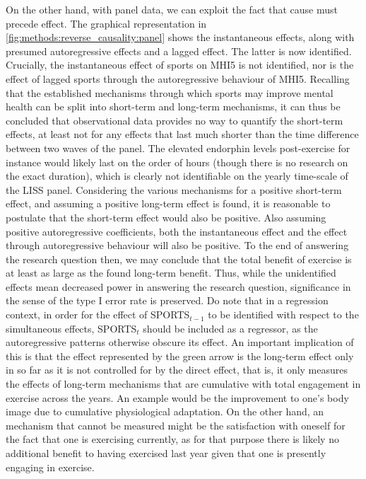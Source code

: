 On the other hand, with panel data, we can exploit the fact that cause must precede effect. The graphical representation
in \cref{fig:methods:reverse_causality:panel} shows the instantaneous effects, along with presumed
autoregressive effects and a lagged effect.
The latter is now identified. Crucially, the instantaneous effect of sports on MHI5 is not identified, nor is the effect
of lagged sports through the autoregressive behaviour of MHI5.
Recalling that the established mechanisms through which sports may improve mental health can be split into short-term
and long-term mechanisms, it can thus be concluded that observational data provides no way to quantify the short-term effects,
at least not for any effects that last much shorter than the time difference between two waves of the panel.
The elevated endorphin levels post-exercise for instance would likely last on the order of hours (though there is no
research on the exact duration), which is clearly not identifiable on the yearly time-scale of the LISS panel.
Considering the various mechanisms for a positive short-term effect, and assuming a positive long-term effect is found,
it is reasonable to postulate that the short-term effect would also be positive.
Also assuming positive autoregressive coefficients, both the instantaneous effect and the effect through
autoregressive behaviour will also be positive.
To the end of answering the research question then, we may conclude that the total benefit of exercise is at least
as large as the found long-term benefit. Thus, while the unidentified effects mean decreased power in answering
the research question, significance in the sense of the type I error rate is preserved.
Do note that in a regression context, in order for the effect of SPORTS$_{t-1}$ to be identified with respect to the simultaneous
effects, SPORTS$_t$ should be included as a regressor, as the autoregressive patterns otherwise obscure its effect.
An important implication of this is that the effect represented by the green arrow is the long-term effect
only in so far as it is not controlled for by the direct effect, that is, it only measures the effects of long-term
mechanisms that are cumulative with total engagement in exercise across the years.
An example would be the improvement to one's body image due to cumulative physiological adaptation.
On the other hand, an mechanism that cannot be measured might be the satisfaction with oneself for the fact that
one is exercising currently, as for that purpose there is likely no additional benefit to having exercised
last year given that one is presently engaging in exercise.

